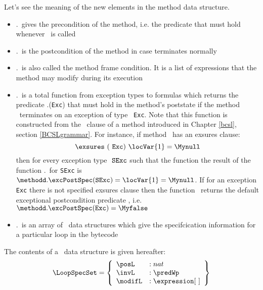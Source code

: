 Let's see the meaning of the new elements in the method data structure.
\begin{itemize}
     \item \methodd.\pre \ gives the precondition of the method, i.e. the predicate that must hold
           whenever \methodd \  is called
     \item \methodd.\normalPost \ is the postcondition of the method in case \methodd terminates normally  
     
     \item \methodd.\modif \ is also called the method frame condition. It is a list of expressions that the method
            may modify during its execution    
     
     \item \methodd.\excPostSpec \ is a total function from exception types to formulas which returns the predicate
           \methodd.\excPostSpec(\texttt{Exc})  that must hold in the method's poststate 
	   if the method \methodd \ terminates on an exception of type \mbox{ \rm \texttt{Exc}}. 
	   Note that this function is constructed from the \exsures \ clause of a method introduced in  Chapter \ref{bcsl},
	   section \ref{BCSLgrammar}. For instance, if method \methodd \ has an exsures clause:
	   $$ \exsures \  ( \mbox{ \rm \texttt{Exc}}) \ \locVar{1} = \Mynull $$
	   then for every exception type $\mbox{ \rm \texttt{SExc}} $ such that 
	   the function  the result of the function \methodd.\excPostSpec \  for  \texttt{SExc} 
           is $\methodd.\excPostSpec(\texttt{SExc} ) = \locVar{1} = \Mynull$. If for an exception \texttt{Exc} there is not specified exsures
	   clause then the function \excPostSpec \ returns the default exceptional postcondition predicate \Myfalse, i.e.
	   $\methodd.\excPostSpec(\texttt{Exc} ) = \Myfalse$
     \item \methodd.\loopSpecTable \ is an array of \LoopSpecSet \ data structures which give the specifcication information 
           for a particular loop in the bytecode         
\end{itemize}

 
The contents of a \LoopSpecSet \ data structure is given hereafter:
$$ \begin{array}{l}
      \LoopSpecSet = \left\{\begin{array}{ll}  
                                       \posL   & : nat \\
                                       \invL   & : \predWp \\                 
	                               \modifL   & :  \expression  \lbrack \ \rbrack  
                            \end{array}  \right\} 
     \end{array} $$ 


